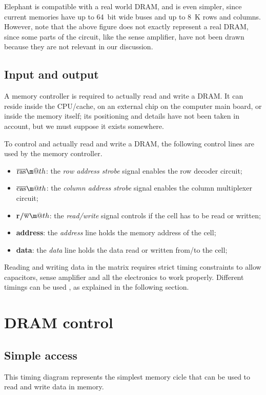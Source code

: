 \documentclass[a4paper,12pt]{article}
\makeatletter
\newcommand*{\textoverline}[1]{$\overline{\hbox{#1}}\m@th$}
\newcommand{\memoryname}{Elephant}
\makeatother
\begin{document}
\memoryname{} is compatible with a real world DRAM, and is even simpler, since current memories have up to 64~bit wide buses and up to 8~K rows and columns.
\\
However, note that the above figure does not exactly represent a real DRAM, since some parts of the circuit, like the sense amplifier, have not been drawn because they are not relevant in our discussion.

\subsection{Input and output}
A memory controller is required to actually read and write a DRAM.
It can reside inside the CPU/cache, on an external chip on the computer main board, or inside the memory itself; its positioning and details have not been taken in account, but we must suppose it exists somewhere.

To control and actually read and write a DRAM, the following control lines are used by the memory controller.

\begin{itemize}
  \item \textbf{\textoverline{ras}}: the \emph{row address strobe} signal enables the row decoder circuit;
  \item \textbf{\textoverline{cas}}: the \emph{column address strobe} signal enables the column multiplexer circuit;
  \item \textbf{r/\textoverline{w}}: the \emph{read/write} signal controls if the cell has to be read or written;
  \item \textbf{address}: the \emph{address} line holds the memory address of the cell;
  \item \textbf{data}: the \emph{data} line holds the data read or written from/to the cell;
\end{itemize}

Reading and writing data in the matrix requires strict timing constraints to allow capacitors, sense amplifier and all the electronics to work properly.
Different timings can be used \cite{bib:ibm}, as explained in the following section.

\section{DRAM control}

\subsection{Simple access} \label{sec:simple-access}
This timing diagram represents the simplest memory cicle that can be used to read and write data in memory.
\end{document}
